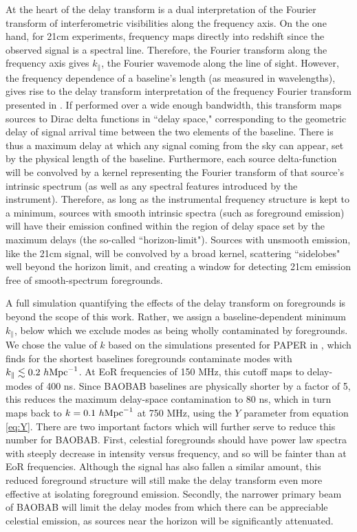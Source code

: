 \documentclass[10pt,iop]{emulateapj}
\begin{document}
At the heart of the delay transform is a dual interpretation of the Fourier transform
of interferometric visibilities along the frequency axis.  On the one hand, for 21cm
experiments, frequency maps directly into redshift since the observed signal is a spectral
line.  Therefore, the Fourier transform along the frequency axis gives $k_{\parallel}$, the
Fourier wavemode along the line of sight.  However, the frequency dependence of a baseline's
length (as measured in wavelengths), gives rise to the delay transform interpretation of the
frequency Fourier transform presented in \citet{parsons_and_backer_2009}.  
If performed over a wide enough bandwidth, this transform
maps sources to Dirac delta functions in ``delay space," corresponding to the geometric
delay of signal arrival time between the two elements of the baseline.  There is thus
a maximum delay at which any signal coming from the sky can appear, set by the physical
length of the baseline.  Furthermore, each source delta-function will be convolved
by a kernel representing the Fourier transform of that source's intrinsic spectrum (as
well as any spectral features introduced by the instrument).  Therefore, as long as the
instrumental frequency structure is kept to a minimum, sources with smooth intrinsic
spectra (such as foreground emission) will have their emission confined within the
region of delay space set by the maximum delays (the so-called ``horizon-limit").  
Sources with unsmooth emission,
like the 21cm signal, will be convolved by a broad kernel, scattering ``sidelobes"
well beyond the horizon limit, and creating a window for detecting 21cm emission free of
smooth-spectrum foregrounds.  

A full simulation quantifying the effects of the delay transform on foregrounds
is beyond the scope of this work.  Rather, we assign a baseline-dependent minimum 
$k_{\parallel}$, below which we exclude modes as being wholly contaminated by foregrounds.
We chose the value of $k$ based on the simulations presented for PAPER
in \citet{parsons_et_al_2012b}, which finds for the shortest baselines
foregrounds contaminate modes with $k_{\parallel} \lesssim 0.2~h\rm{Mpc}^{-1}$.  
At EoR frequencies of 150 MHz, this cutoff maps to delay-modes of 400 ns.  Since BAOBAB
baselines are physically shorter by a factor of 5, this reduces the maximum
delay-space contamination to 80 ns, which in turn maps back to $k = 0.1~h\rm{Mpc}^{-1}$
at 750 MHz, using the $Y$ parameter from equation \ref{eq:Y}.
There are two important factors which will further serve to reduce this number
for BAOBAB.  First, celestial foregrounds should have power law spectra with steeply decrease
in intensity versus frequency, and so will be fainter than at EoR frequencies. 
Although the signal has also fallen a similar amount, this reduced foreground structure will still make the delay transform even more
effective at isolating foreground emission.  Secondly, the narrower primary beam of BAOBAB
will limit the delay modes from which there can be appreciable celestial emission,
as sources near the horizon will be significantly attenuated.  
\end{document}
